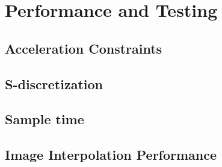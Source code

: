 \chapter{Performance and Testing}

\section{Acceleration Constraints}
	
\section{S-discretization}
	
	
\section{Sample time}

\section{Image Interpolation Performance}
